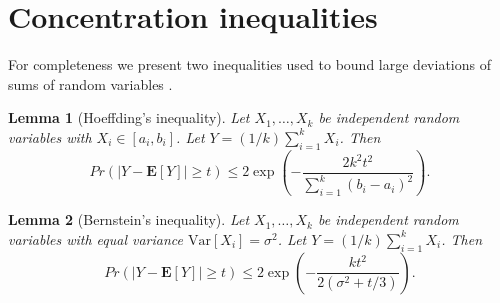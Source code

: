 \documentclass[12pt]{article}
\newtheorem{lemma}{Lemma}
\newcommand{\E}[1]{\mathbf{E}\left[#1\right]}
\newcommand{\V}[1]{\textrm{Var}[#1]}
\begin{document}
	\section{Concentration inequalities}
	
		For completeness we present two inequalities used to bound large deviations of sums of random variables \cite{BoucheronLB03}.
	
		\begin{lemma}[Hoeffding's inequality] \label{hoeffding}
		Let $X_1, \ldots, X_k$ be independent random variables with $X_i \in [a_i, b_i]$. Let $Y = (1/k) \sum_{i = 1}^k X_i$. Then
\begin{equation*}
		 	Pr\left(\left|Y - \E{Y}\right| \ge t\right) \le 2 \exp\left( -\frac{2k^2 t^2}{\sum_{i = 1}^k (b_i - a_i)^2} \right).
		 \end{equation*}
	\end{lemma}

	\begin{lemma}[Bernstein's inequality] \label{bernIneq}
		Let $X_1, \ldots, X_k$ be independent random variables with equal variance $\V{X_i} = \sigma^2$. Let $Y = (1/k) \sum_{i = 1}^k X_i$. Then
\begin{equation*}
		 	Pr\left(\left|Y - \E{Y}\right| \ge t\right) \le 2 \exp\left( -\frac{k t^2}{2(\sigma^2 + t/3)} \right).
		 \end{equation*}
	\end{lemma}

		
		
		
\end{document}
